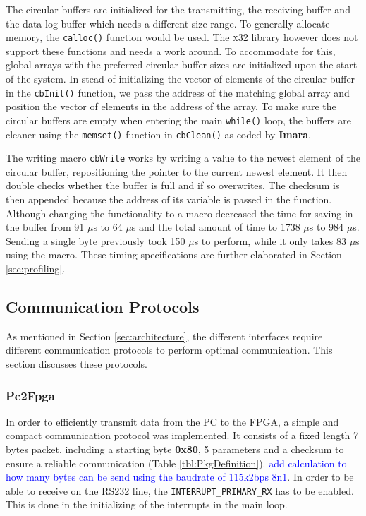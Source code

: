 \documentclass{article}
\newcommand\todo[1]{\textcolor{blue}{#1}} %
\begin{document}
The circular buffers are initialized for the transmitting, the receiving buffer and the data log buffer which needs a different size range. To generally allocate memory, the \texttt{calloc()} function would be used. The \textsc{x32} library however does not support these functions and needs a work around. To accommodate for this, global arrays with the preferred circular buffer sizes are initialized upon the start of the system. In stead of initializing the vector of elements of the circular buffer in the \texttt{cbInit()} function, we pass the address of the matching global array and position the vector of elements in the address of the array.  To make sure the circular buffers are empty when entering the main \texttt{while()} loop, the buffers are cleaner using the \texttt{memset()} function in \texttt{cbClean()} as coded by \textbf{Imara}.

The writing macro \texttt{cbWrite} works by writing a value to the newest element of the circular buffer, repositioning the pointer to the current newest element. It then double checks whether the buffer is full and if so overwrites. The checksum is then appended because the address of its variable is passed in the function. Although changing the functionality to a macro decreased the time for saving in the buffer from 91 $\mu$s to 64 $\mu$s and the total amount of time to 1738 $\mu$s to 984 $\mu$s. Sending a single byte previously took 150 $\mu$s to perform, while it only takes 83 $\mu$s using the macro. These timing specifications are further elaborated in Section \ref{sec:profiling}.

\subsection{Communication Protocols}
\label{sec:communication}
As mentioned in Section \ref{sec:architecture}, the different interfaces require different communication protocols to perform optimal communication. This section discusses these protocols. 


\subsubsection{Pc2Fpga}
In order to efficiently transmit  data from the PC to the FPGA, a simple and compact communication protocol was implemented. It consists of a fixed length 7 bytes packet, including a starting byte \textbf{0x80}, 5 parameters and a checksum to ensure a reliable communication (Table \ref{tbl:PkgDefinition}). \todo{add calculation to how many bytes can be send using the baudrate of 115k2bps 8n1}. In order to be able to receive on the RS232 line, the \texttt{INTERRUPT\_PRIMARY\_RX} has to be enabled. This is done in the initializing of the interrupts in the main loop. 
\end{document}
